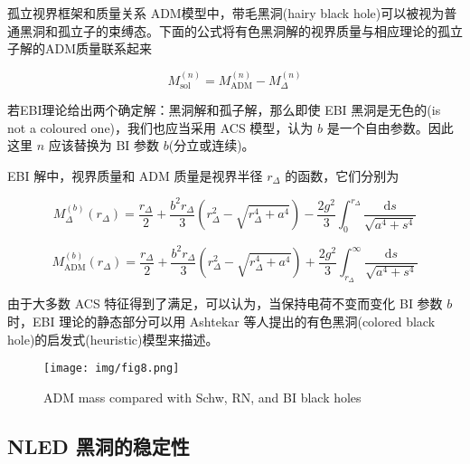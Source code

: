 \documentclass[9pt, dvipsnames]{beamer} %
\begin{document}
\begin{frame}{孤立视界框架和质量关系}
    ADM模型中，带毛黑洞(hairy black hole)可以被视为普通黑洞和孤立子的束缚态。下面的公式将有色黑洞解的视界质量与相应理论的孤立子解的ADM质量联系起来

    $$
    M_{\mathrm{sol}}^{(n)} = M_{\mathrm{ADM}}^{(n)} - M_\Delta^{(n)} 
    $$

    若EBI理论给出两个确定解：黑洞解和孤子解，那么即使 EBI 黑洞是无色的(is not a coloured one)，我们也应当采用 ACS 模型，认为 $b$ 是一个自由参数。因此这里 $n$ 应该替换为 BI 参数 $b$(分立或连续)。 

    EBI 解中，视界质量和 ADM 质量是视界半径 $r_\Delta$ 的函数，它们分别为

    $$
    M_\Delta^{(b)}(r_\Delta)
    =\frac{r_\Delta }{2 } + \frac{b^2 r_\Delta }{3 } \left(r_\Delta^2 - \sqrt{r_\Delta^4 + a^4} \right) - \frac{2g^2 }{3 } \int_0^{r_\Delta} \frac{\mathrm{d}s }{\sqrt{a^4+s^4} } 
    $$

    $$
    M_{\mathrm{ADM}}^{(b)}(r_\Delta)
    =\frac{r_\Delta }{2 } + \frac{b^2 r_\Delta }{3 } \left(r_\Delta^2 - \sqrt{r_\Delta^4 + a^4} \right) + \frac{2g^2 }{3 } \int_{r_\Delta}^{\infty} \frac{\mathrm{d}s }{\sqrt{a^4+s^4} }
    $$

    由于大多数 ACS 特征得到了满足，可以认为，当保持电荷不变而变化 BI 参数 $b$ 时，EBI 理论的静态部分可以用 Ashtekar 等人提出的有色黑洞(colored black hole)的启发式(heuristic)模型来描述。

\end{frame}

\begin{frame}
    \begin{figure}
        \centering
        \texttt{[image: img/fig8.png]}
        \caption{ADM mass compared with Schw, RN, and BI black holes}
    \end{figure}
\end{frame}

\subsection{NLED 黑洞的稳定性}
\end{document}
